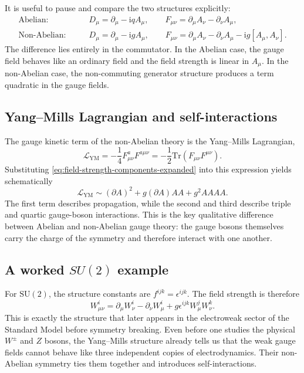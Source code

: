 \documentclass[11pt,a4paper]{article}
\newcommand{\Lag}{\mathcal{L}}
\newcommand{\ii}{\mathrm{i}}
\newcommand{\p}{\partial}
\newcommand{\Tr}{\mathrm{Tr}}
\newcommand{\comm}[2]{\left[#1,#2\right]}
\newcommand{\SU}{\mathrm{SU}}
\begin{document}
It is useful to pause and compare the two structures explicitly:
\begin{align*}
\text{Abelian:}
&\qquad D_\mu=\p_\mu-\ii qA_\mu,
\qquad F_{\mu\nu}=\p_\mu A_\nu-\p_\nu A_\mu,
\\[0.4em]
\text{Non-Abelian:}
&\qquad D_\mu=\p_\mu-\ii gA_\mu,
\qquad F_{\mu\nu}=\p_\mu A_\nu-\p_\nu A_\mu-\ii g\comm{A_\mu}{A_\nu}.
\end{align*}
The difference lies entirely in the commutator. In the Abelian case, the gauge field behaves like an ordinary field and the field strength is linear in \(A_\mu\). In the non-Abelian case, the non-commuting generator structure produces a term quadratic in the gauge fields.



\subsection{Yang--Mills Lagrangian and self-interactions}

The gauge kinetic term of the non-Abelian theory is the Yang--Mills Lagrangian,
\begin{equation}
\Lag_{\text{YM}}=-\frac14 F_{\mu\nu}^aF^{a\mu\nu}
=-\frac12\Tr(F_{\mu\nu}F^{\mu\nu}).
\label{eq:yang-mills-lagrangian-expanded}
\end{equation}
Substituting \eqref{eq:field-strength-components-expanded} into this expression yields schematically
\[
\Lag_{\text{YM}}\sim (\p A)^2 + g(\p A)AA + g^2AAAA.
\]
The first term describes propagation, while the second and third describe triple and quartic gauge-boson interactions. This is the key qualitative difference between Abelian and non-Abelian gauge theory: the gauge bosons themselves carry the charge of the symmetry and therefore interact with one another.



\subsection{A worked \texorpdfstring{$SU(2)$}{SU(2)} example}

For \(\SU(2)\), the structure constants are \(f^{ijk}=\epsilon^{ijk}\). The field strength is therefore
\begin{equation}
W_{\mu\nu}^i=\p_\mu W_\nu^i-\p_\nu W_\mu^i+g\epsilon^{ijk}W_\mu^jW_\nu^k.
\label{eq:su2-field-strength-worked}
\end{equation}
This is exactly the structure that later appears in the electroweak sector of the Standard Model before symmetry breaking. Even before one studies the physical \(W^\pm\) and \(Z\) bosons, the Yang--Mills structure already tells us that the weak gauge fields cannot behave like three independent copies of electrodynamics. Their non-Abelian symmetry ties them together and introduces self-interactions.
\end{document}
